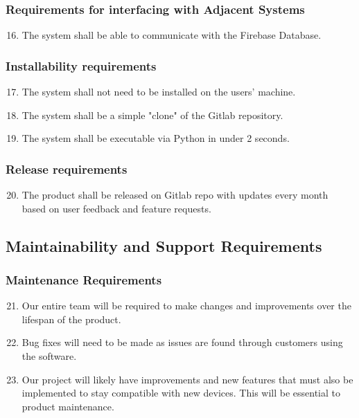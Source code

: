 \documentclass[12pt, titlepage]{article}
\begin{document}
\subsubsection{Requirements for interfacing with Adjacent Systems}
    \begin{enumerate}
    \setcounter{enumi}{15}
        \item The system shall be able to communicate with the Firebase Database.
    \end{enumerate}
\subsubsection{Installability requirements}
    \begin{enumerate}
    \setcounter{enumi}{16}
        \item The system shall not need to be installed on the users' machine.
        \item The system shall be a simple "clone" of the Gitlab repository.
        \item The system shall be executable via Python in under 2 seconds.
    \end{enumerate}
\subsubsection{Release requirements}
    \begin{enumerate}
    \setcounter{enumi}{19}
        \item The product shall be released on Gitlab repo with updates every month based on user feedback and feature requests.
    \end{enumerate}
    
\subsection{Maintainability and Support Requirements}
\subsubsection{Maintenance Requirements}
    \begin{enumerate}
    \setcounter{enumi}{20}
        \item Our entire team will be required to make changes and improvements over the lifespan of the product.
        \item Bug fixes will need to be made as issues are found through customers using the software.
        \item Our project will likely have improvements and new features that must also be implemented to stay compatible with new devices. This will be essential to product maintenance.
    \end{enumerate}
\end{document}
